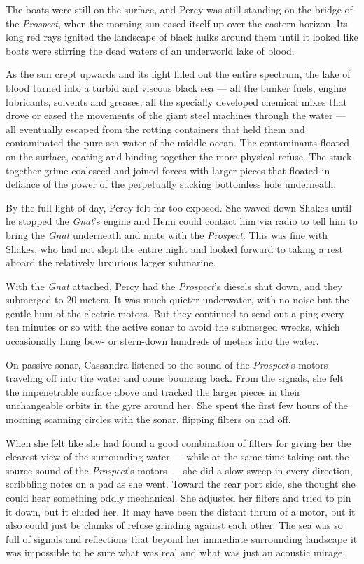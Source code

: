 \documentclass[
]{scrbook}
\begin{document}
The boats were still on the surface, and Percy was still standing on the
bridge of the \emph{Prospect}, when the morning sun eased itself up over
the eastern horizon. Its long red rays ignited the landscape of black
hulks around them until it looked like boats were stirring the dead
waters of an underworld lake of blood.

As the sun crept upwards and its light filled out the entire spectrum,
the lake of blood turned into a turbid and viscous black sea --- all the
bunker fuels, engine lubricants, solvents and greases; all the specially
developed chemical mixes that drove or eased the movements of the giant
steel machines through the water --- all eventually escaped from the
rotting containers that held them and contaminated the pure sea water of
the middle ocean. The contaminants floated on the surface, coating and
binding together the more physical refuse. The stuck-together grime
coalesced and joined forces with larger pieces that floated in defiance
of the power of the perpetually sucking bottomless hole underneath.

By the full light of day, Percy felt far too exposed. She waved down
Shakes until he stopped the \emph{Gnat}'s engine and Hemi could contact
him via radio to tell him to bring the \emph{Gnat} underneath and mate
with the \emph{Prospect}. This was fine with Shakes, who had not slept
the entire night and looked forward to taking a rest aboard the
relatively luxurious larger submarine.

With the \emph{Gnat} attached, Percy had the \emph{Prospect}'s diesels
shut down, and they submerged to 20 meters. It was much quieter
underwater, with no noise but the gentle hum of the electric motors. But
they continued to send out a ping every ten minutes or so with the
active sonar to avoid the submerged wrecks, which occasionally hung bow-
or stern-down hundreds of meters into the water.

On passive sonar, Cassandra listened to the sound of the
\emph{Prospect}'s motors traveling off into the water and come bouncing
back. From the signals, she felt the impenetrable surface above and
tracked the larger pieces in their unchangeable orbits in the gyre
around her. She spent the first few hours of the morning scanning
circles with the sonar, flipping filters on and off.

When she felt like she had found a good combination of filters for
giving her the clearest view of the surrounding water --- while at the
same time taking out the source sound of the \emph{Prospect}'s motors
--- she did a slow sweep in every direction, scribbling notes on a pad
as she went. Toward the rear port side, she thought she could hear
something oddly mechanical. She adjusted her filters and tried to pin it
down, but it eluded her. It may have been the distant thrum of a motor,
but it also could just be chunks of refuse grinding against each other.
The sea was so full of signals and reflections that beyond her immediate
surrounding landscape it was impossible to be sure what was real and
what was just an acoustic mirage.
\end{document}
